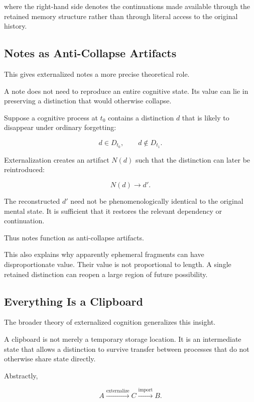 \documentclass[11pt]{article}
\theoremstyle{remark}
\begin{document}
where the right-hand side denotes the continuations made available through the retained memory structure rather than through literal access to the original history.

\subsection{Notes as Anti-Collapse Artifacts}

This gives externalized notes a more precise theoretical role.

A note does not need to reproduce an entire cognitive state. Its value can lie in preserving a distinction that would otherwise collapse.

Suppose a cognitive process at $t_0$ contains a distinction $d$ that is likely to disappear under ordinary forgetting:

\begin{equation}
d\in D_{t_0},
\qquad
d\notin D_{t_1}.
\end{equation}

Externalization creates an artifact $N(d)$ such that the distinction can later be reintroduced:

\begin{equation}
N(d)
\longrightarrow
d'.
\end{equation}

The reconstructed $d'$ need not be phenomenologically identical to the original mental state. It is sufficient that it restores the relevant dependency or continuation.

Thus notes function as anti-collapse artifacts.

This also explains why apparently ephemeral fragments can have disproportionate value. Their value is not proportional to length. A single retained distinction can reopen a large region of future possibility.

\subsection{Everything Is a Clipboard}

The broader theory of externalized cognition generalizes this insight.

A clipboard is not merely a temporary storage location. It is an intermediate state that allows a distinction to survive transfer between processes that do not otherwise share state directly.

Abstractly,

\begin{equation}
A
\xrightarrow{\operatorname{externalize}}
C
\xrightarrow{\operatorname{import}}
B.
\end{equation}
\end{document}
